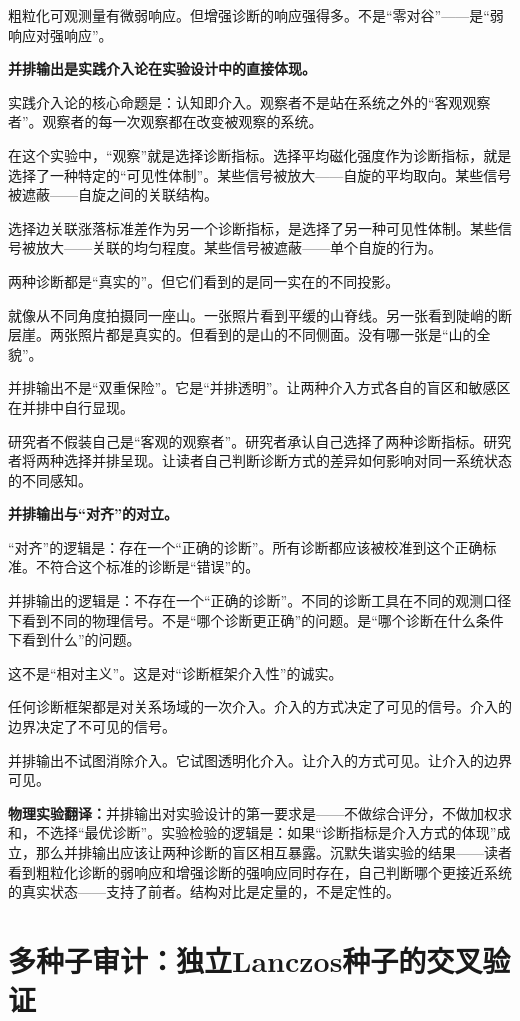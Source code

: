 \documentclass[11pt,a4paper]{book}
\theoremstyle{definition}
\begin{document}
粗粒化可观测量有微弱响应。但增强诊断的响应强得多。不是“零对谷”——是“弱响应对强响应”。

\textbf{并排输出是实践介入论在实验设计中的直接体现。}

实践介入论的核心命题是：认知即介入。观察者不是站在系统之外的“客观观察者”。观察者的每一次观察都在改变被观察的系统。

在这个实验中，“观察”就是选择诊断指标。选择平均磁化强度作为诊断指标，就是选择了一种特定的“可见性体制”。某些信号被放大——自旋的平均取向。某些信号被遮蔽——自旋之间的关联结构。

选择边关联涨落标准差作为另一个诊断指标，是选择了另一种可见性体制。某些信号被放大——关联的均匀程度。某些信号被遮蔽——单个自旋的行为。

两种诊断都是“真实的”。但它们看到的是同一实在的不同投影。

就像从不同角度拍摄同一座山。一张照片看到平缓的山脊线。另一张看到陡峭的断层崖。两张照片都是真实的。但看到的是山的不同侧面。没有哪一张是“山的全貌”。

并排输出不是“双重保险”。它是“并排透明”。让两种介入方式各自的盲区和敏感区在并排中自行显现。

研究者不假装自己是“客观的观察者”。研究者承认自己选择了两种诊断指标。研究者将两种选择并排呈现。让读者自己判断诊断方式的差异如何影响对同一系统状态的不同感知。

\textbf{并排输出与“对齐”的对立。}

“对齐”的逻辑是：存在一个“正确的诊断”。所有诊断都应该被校准到这个正确标准。不符合这个标准的诊断是“错误”的。

并排输出的逻辑是：不存在一个“正确的诊断”。不同的诊断工具在不同的观测口径下看到不同的物理信号。不是“哪个诊断更正确”的问题。是“哪个诊断在什么条件下看到什么”的问题。

这不是“相对主义”。这是对“诊断框架介入性”的诚实。

任何诊断框架都是对关系场域的一次介入。介入的方式决定了可见的信号。介入的边界决定了不可见的信号。

并排输出不试图消除介入。它试图透明化介入。让介入的方式可见。让介入的边界可见。

\textbf{物理实验翻译：}并排输出对实验设计的第一要求是——不做综合评分，不做加权求和，不选择“最优诊断”。实验检验的逻辑是：如果“诊断指标是介入方式的体现”成立，那么并排输出应该让两种诊断的盲区相互暴露。沉默失谐实验的结果——读者看到粗粒化诊断的弱响应和增强诊断的强响应同时存在，自己判断哪个更接近系统的真实状态——支持了前者。结构对比是定量的，不是定性的。

\section{多种子审计：独立Lanczos种子的交叉验证}\label{sec:multiseed-audit}
\end{document}
